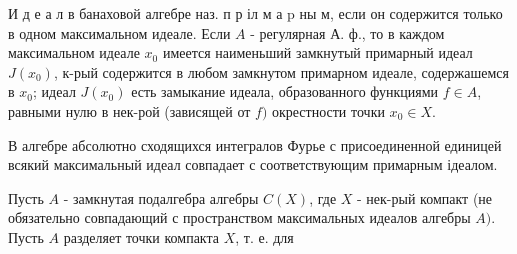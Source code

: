 \documentclass[10pt]{article}
\begin{document}
И д е а л в банаховой алгебре наз. п р іл м а $\mathrm{p}$ ны м, если он содержится только в одном максимальном идеале. Если $A$ - регулярная А. ф., то в каждом максимальном идеале $x_{0}$ имеется наименьший замкнутый примарный идеал $J\left(x_{0}\right)$, к-рый содержится в любом замкнутом примарном идеале, содержашемся в $x_{0}$; идеал $J\left(x_{0}\right)$ есть замыкание идеала, образованного функциями $f \in A$, равными нулю в нек-рой (зависящей от $f)$ окрестности точки $x_{0} \in X$.



В алгебре абсолютно сходящихся интегралов Фурье с присоединенной единицей всякий максимальный идеал совпадает с соответствующим примарным ідеалом.



Пусть $A$ - замкнутая подалгебра алгебры $C(X)$, где $X$ - нек-рый компакт (не обязательно совпадающий с пространством максимальных идеалов алгебры $A)$. Пусть $A$ разделяет точки компакта $X$, т. е. для
\end{document}
